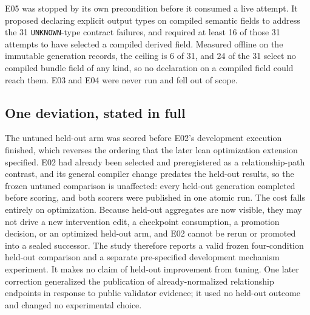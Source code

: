 E05 was stopped by its own precondition before it consumed a live attempt. It
proposed declaring explicit output types on compiled semantic fields to address
the 31 \texttt{UNKNOWN}-type contract failures, and required at least 16 of those
31 attempts to have selected a compiled derived field. Measured offline on the
immutable generation records, the ceiling is 6 of 31, and 24 of the 31 select no
compiled bundle field of any kind, so no declaration on a compiled field could
reach them. E03 and E04 were never run and fell out of scope.

\subsection{One deviation, stated in full}

The untuned held-out arm was scored before E02's development execution finished,
which reverses the ordering that the later lean optimization extension specified.
E02 had already been selected and preregistered as a relationship-path contrast,
and its general compiler change predates the held-out results, so the frozen
untuned comparison is unaffected: every held-out generation completed before
scoring, and both scorers were published in one atomic run. The cost falls
entirely on optimization. Because held-out aggregates are now visible, they may
not drive a new intervention edit, a checkpoint consumption, a promotion
decision, or an optimized held-out arm, and E02 cannot be rerun or promoted into
a sealed successor. The study therefore reports a valid frozen four-condition
held-out comparison and a separate pre-specified development mechanism
experiment. It makes no claim of held-out improvement from tuning. One later
correction generalized the publication of already-normalized relationship
endpoints in response to public validator evidence; it used no held-out outcome
and changed no experimental choice.
